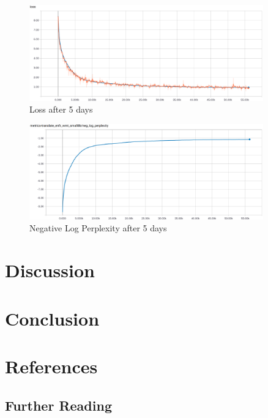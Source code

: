 \documentclass[10pt,a4paper]{article}
\begin{document}
\begin{figure}[H]
  \begin{center}
    \includegraphics[width=0.9\textwidth] {loss.png}
    \caption{Loss after 5 days}
  \end{center}
\end{figure}


\begin{figure}[H]
  \begin{center}
    \includegraphics[width=0.9\textwidth] {neg_log_perp.png}
    \caption{Negative Log Perplexity after 5 days}
  \end{center}
\end{figure}



\section{Discussion}


\section{Conclusion}


\section{References}


\subsection{Further Reading}
\end{document}
